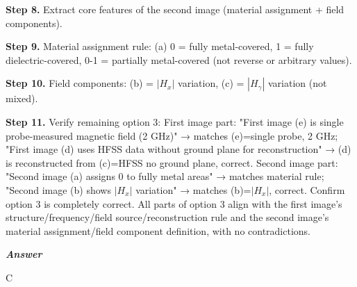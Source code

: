 \begin{tcolorbox}[
    breakable,
    title=Example of Experimental Reasoning in Information,
    colback=LighterGray,
    colframe=DeepPurple,
    colbacktitle=DeepPurple,
    coltitle=White,
]
\textbf{\textcolor{CaseOrange}{Step 8.}} Extract core features of the second image (material assignment + field components).

\textbf{\textcolor{CaseOrange}{Step 9.}} Material assignment rule: (a) 0 = fully metal-covered, 1 = fully dielectric-covered, 0-1 = partially metal-covered (not reverse or arbitrary values).

\textbf{\textcolor{CaseOrange}{Step 10.}} Field components: (b) = $|H_x|$ variation, (c) = $|H_\gamma|$ variation (not mixed).

\textbf{\textcolor{CaseOrange}{Step 11.}} Verify remaining option 3: First image part: "First image (e) is single probe-measured magnetic field (2 GHz)" → matches (e)=single probe, 2 GHz; "First image (d) uses HFSS data without ground plane for reconstruction" → (d) is reconstructed from (c)=HFSS no ground plane, correct. Second image part: "Second image (a) assigns 0 to fully metal areas" → matches material rule; "Second image (b) shows $|H_x|$ variation" → matches (b)=$|H_x|$, correct. Confirm option 3 is completely correct. All parts of option 3 align with the first image's structure/frequency/field source/reconstruction rule and the second image's material assignment/field component definition, with no contradictions.

\textbf{\emph{\textcolor{DeepPurple}{Answer}}}

C

\end{tcolorbox}





